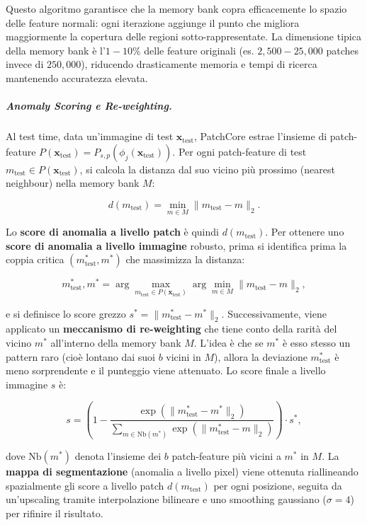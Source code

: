 Questo algoritmo garantisce che la memory bank copra efficacemente lo spazio delle feature normali: ogni iterazione aggiunge il punto che migliora maggiormente la copertura delle regioni sotto-rappresentate. La dimensione tipica della memory bank è l'$1-10\%$ delle feature originali (es. $2,500-25,000$ patches invece di $250,000$), riducendo drasticamente memoria e tempi di ricerca mantenendo accuratezza elevata.

\subparagraph{Anomaly Scoring e Re-weighting.}

Al test time, data un'immagine di test $\mathbf{x}_{\text{test}}$, PatchCore estrae l'insieme di patch-feature $P(\mathbf{x}_{\text{test}}) = P_{s,p}(\phi_j(\mathbf{x}_{\text{test}}))$. Per ogni patch-feature di test $m_{\text{test}} \in P(\mathbf{x}_{\text{test}})$, si calcola la distanza dal suo vicino più prossimo (nearest neighbour) nella memory bank $M$:

\begin{equation}
d(m_{\text{test}}) = \min_{m \in M} \| m_{\text{test}} - m \|_2 .
\end{equation}

Lo \textbf{score di anomalia a livello patch} è quindi $d(m_{\text{test}})$. Per ottenere uno \textbf{score di anomalia a livello immagine} robusto, prima si identifica prima la coppia critica $(m_{\text{test}}^*, m^*)$ che massimizza la distanza:

\begin{equation}
m_{\text{test}}^*, m^* = \arg\max_{m_{\text{test}} \in P(\mathbf{x}_{\text{test}})} \arg\min_{m \in M} \| m_{\text{test}} - m \|_2,
\end{equation}

e si definisce lo score grezzo $s^* = \| m_{\text{test}}^* - m^* \|_2$. Successivamente, viene applicato un \textbf{meccanismo di re-weighting} che tiene conto della rarità del vicino $m^*$ all'interno della memory bank $M$. L'idea è che se $m^*$ è esso stesso un pattern raro (cioè lontano dai suoi $b$ vicini in $M$), allora la deviazione $m_{\text{test}}^*$ è meno sorprendente e il punteggio viene attenuato. Lo score finale a livello immagine $s$ è:

\begin{equation}
s = \left(1 - \frac{\exp(\| m_{\text{test}}^* - m^* \|_2)}{\sum_{m \in \text{Nb}(m^*)} \exp(\| m_{\text{test}}^* - m \|_2)} \right) \cdot s^*,
\end{equation}

dove $\text{Nb}(m^*)$ denota l'insieme dei $b$ patch-feature più vicini a $m^*$ in $M$. La \textbf{mappa di segmentazione} (anomalia a livello pixel) viene ottenuta ri\-al\-li\-ne\-an\-do spazialmente gli score a livello patch $d(m_{\text{test}})$ per ogni posizione, seguita da un'upscaling tramite interpolazione bilineare e uno smoothing gaussiano ($\sigma=4$) per rifinire il risultato.

